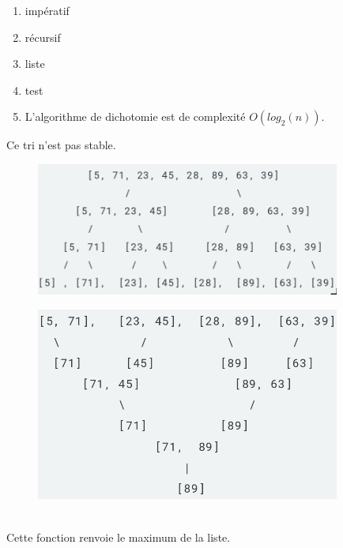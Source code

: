 \documentclass[a4paper,11pt]{article}
\begin{document}
\begin{Form}
\begin{exo}
\begin{enumerate}
\item impératif

\item récursif

\item liste

\item test

\item L'algorithme de dichotomie est de complexité $O(log_2(n))$.
\end{enumerate}
\end{exo}
\begin{exo}

Ce tri n'est pas stable.
\end{exo}
\begin{exo}
\begin{figure}[!h]
\centering
\includegraphics[width=10cm]{ressources/separation.png}
\label{separation}
\end{figure}
\begin{figure}[!h]
\centering
\includegraphics[width=10cm]{ressources/combinaison.png}
\label{combinaison}
\end{figure}
\\Cette fonction renvoie le maximum de la liste.
\end{exo}
\end{Form}
\end{document}
